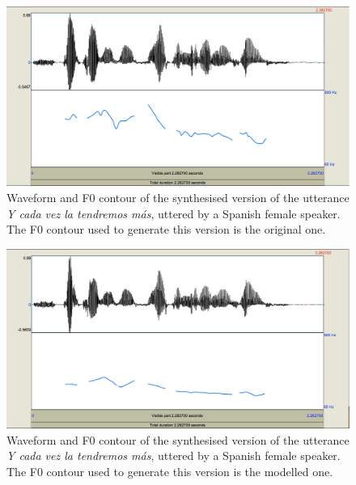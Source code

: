 \documentclass[output=paper]{langsci/langscibook}
\begin{document}
 \begin{figure}[p]
\includegraphics[width=\textwidth]{figures/GAR-img005.png}
\caption{Waveform and F0 contour of the synthesised version of the utterance \textit{Y cada vez la tendremos más}, uttered by a Spanish female speaker. The F0 contour used to generate this version is the original one.}
\label{fig:gar:5}
\end{figure}

 
\begin{figure}[p]
\includegraphics[width=\textwidth]{figures/GAR-img006.png}
\caption{Waveform and F0 contour of the synthesised version of the utterance \textit{Y cada vez la tendremos más}, uttered by a Spanish female speaker. The F0 contour used to generate this version is the modelled one.}
\label{fig:gar:6}
\end{figure}
\end{document}
